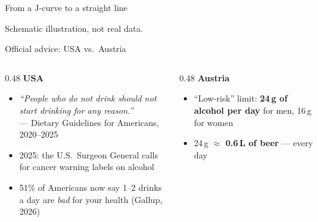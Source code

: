 \documentclass[aspectratio=169,11pt]{beamer}
\begin{document}
\begin{frame}{From a J-curve to a straight line}
  \centering

  {\tiny\color{muted} Schematic illustration, not real data.}
\end{frame}

\begin{frame}{Official advice: USA vs.\ Austria}
  \begin{columns}[T]
    \begin{column}{0.48\textwidth}
      \textbf{\color{oldblue}USA}
      \begin{itemize}\setlength{\itemsep}{0.6em}
        \item \emph{``People who do not drink should not start drinking for any reason.''}\\
          {\footnotesize\color{muted} --- Dietary Guidelines for Americans, 2020--2025}
        \item 2025: the U.S.\ Surgeon General calls for cancer warning labels on alcohol
        \item 51\% of Americans now say 1--2 drinks a day are \emph{bad} for your health (Gallup, 2026)
      \end{itemize}
    \end{column}
    \begin{column}{0.48\textwidth}
      \textbf{\color{austria}Austria}
      \begin{itemize}\setlength{\itemsep}{0.6em}
        \item ``Low-risk'' limit: \textbf{24\,g of alcohol per day} for men, 16\,g for women
        \item 24\,g $\approx$ \textbf{0.6\,L of beer} --- every day
      \end{itemize}
    \end{column}
  \end{columns}
\end{frame}
\end{document}
